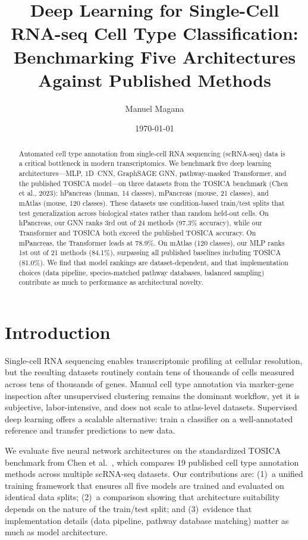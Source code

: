 \documentclass[11pt,letterpaper]{article}
\title{Deep Learning for Single-Cell RNA-seq Cell Type Classification:\\
       Benchmarking Five Architectures Against Published Methods}
\author{Manuel Magana}
\affil{Deep Learning Final Project}
\date{\today}
\begin{document}
\maketitle

\begin{abstract}
Automated cell type annotation from single-cell RNA sequencing (scRNA-seq) data
is a critical bottleneck in modern transcriptomics. We benchmark five deep
learning architectures---MLP, 1D~CNN, GraphSAGE GNN, pathway-masked Transformer,
and the published TOSICA model---on three datasets from the TOSICA benchmark
(Chen et al., 2023): hPancreas (human, 14 classes), mPancreas (mouse, 21
classes), and mAtlas (mouse, 120 classes). These datasets use condition-based
train/test splits that test generalization across biological states rather than
random held-out cells. On hPancreas, our GNN ranks 3rd out of 24 methods
(97.3\% accuracy), while our Transformer and TOSICA both exceed the published
TOSICA accuracy. On mPancreas, the Transformer leads at 78.9\%. On mAtlas
(120 classes), our MLP ranks 1st out of 21 methods (84.1\%), surpassing all
published baselines including TOSICA (81.0\%). We find that model rankings are
dataset-dependent, and that implementation choices (data pipeline,
species-matched pathway databases, balanced sampling) contribute as much to
performance as architectural novelty.
\end{abstract}

\section{Introduction}

Single-cell RNA sequencing enables transcriptomic profiling at cellular
resolution, but the resulting datasets routinely contain tens of thousands of
cells measured across tens of thousands of genes. Manual cell type annotation
via marker-gene inspection after unsupervised clustering remains the dominant
workflow, yet it is subjective, labor-intensive, and does not scale to atlas-level
datasets. Supervised deep learning offers a scalable alternative: train a
classifier on a well-annotated reference and transfer predictions to new data.

We evaluate five neural network architectures on the standardized TOSICA
benchmark from Chen et al.~\cite{chen2023tosica}, which compares 19 published
cell type annotation methods across multiple scRNA-seq datasets. Our
contributions are: (1)~a unified training framework that ensures all five models
are trained and evaluated on identical data splits; (2)~a comparison showing that
architecture suitability depends on the nature of the train/test split; and
(3)~evidence that implementation details (data pipeline, pathway database
matching) matter as much as model architecture.
\end{document}
